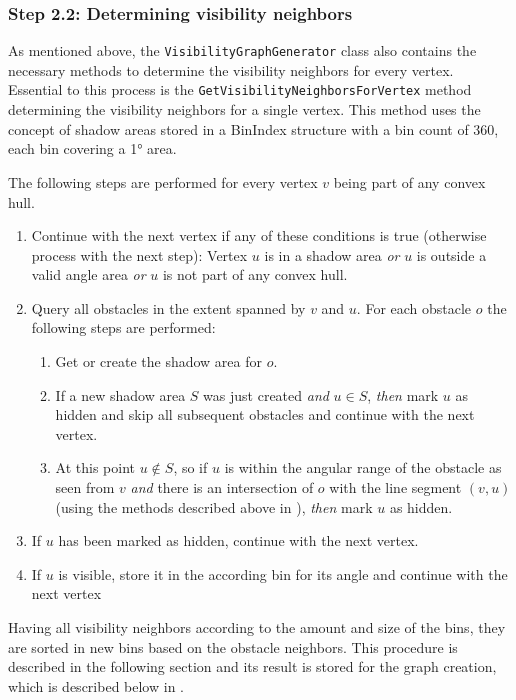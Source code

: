		\subsubsection{Step 2.2: Determining visibility neighbors}
		
			As mentioned above, the \texttt{VisibilityGraphGenerator} class also contains the necessary methods to determine the visibility neighbors for every vertex.
			Essential to this process is the \texttt{GetVisibilityNeighborsForVertex} method determining the visibility neighbors for a single vertex.
			This method uses the concept of shadow areas stored in a BinIndex structure with a bin count of 360, each bin covering a 1° area.
			
			The following steps are performed for every vertex $v$ being part of any convex hull.
			\begin{enumerate}[leftmargin=2.25em+\widthof{2.2.},label={2.2.\arabic*.}]
				\item Continue with the next vertex if any of these conditions is true (otherwise process with the next step): Vertex $u$ is in a shadow area \emph{or} $u$ is outside a valid angle area \emph{or} $u$ is not part of any convex hull.
				\item Query all obstacles in the extent spanned by $v$ and $u$. For each obstacle $o$ the following steps are performed:
				\begin{enumerate}[leftmargin=2.25em+\widthof{2.2.}-1em]
					\item Get or create the shadow area for $o$.
					\item If a new shadow area $S$ was just created \emph{and} $u \in S$, \emph{then} mark $u$ as hidden and skip all subsequent obstacles and continue with the next vertex.\label{itm:if-u-not-on-obstacle}
					\item At this point $u \not\in S$, so if $u$ is within the angular range of the obstacle as seen from $v$ \emph{and} there is an intersection of $o$ with the line segment $(v, u)$ (using the methods described above in \emph{}), \emph{then} mark $u$ as hidden.
				\end{enumerate}
				\item If $u$ has been marked as hidden, continue with the next vertex.
				\item If $u$ is visible, store it in the according bin for its angle and continue with the next vertex
			\end{enumerate}
			Having all visibility neighbors according to the amount and size of the bins, they are sorted in new bins based on the obstacle neighbors.
			This procedure is described in the following section and its result is stored for the graph creation, which is described below in .
		
